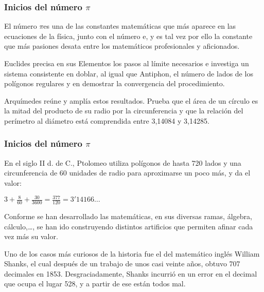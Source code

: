 \documentclass{beamer}
\newcommand{\PI}{{$\pi$}}
\begin{document}
\begin{frame}
\frametitle{Inicios del número \PI}

El número \PI  es una de las constantes matemáticas que más aparece en las ecuaciones de la física, junto con el número e, y es tal vez por ello la constante que más pasiones desata entre los matemáticos profesionales y aficionados.

Euclides precisa en sus Elementos los pasos al límite necesarios e investiga un sistema consistente en doblar, al igual que Antiphon, el número de lados de los polígonos regulares y en demostrar la convergencia del procedimiento.

Arquímedes reúne y amplía estos resultados. Prueba que el área de un círculo es la mitad del producto de su radio por la circunferencia y que la relación del perímetro al diámetro está comprendida entre 3,14084 y 3,14285.

\end{frame}

\begin{frame}
\frametitle{Inicios del número \PI}

En el siglo II d. de C., Ptolomeo utiliza polígonos de hasta 720 lados y una circunferencia de 60 unidades de radio para  aproximarse un poco más, y da el valor:

\centerline{$3 + \frac{8}{60} + \frac {30}{3600}= \frac{377}{120} = 3'14166\dots$}

Conforme se han desarrollado las matemáticas, en sus diversas ramas, álgebra, cálculo,\dots, se han ido construyendo distintos artificios que permiten afinar cada vez más su valor.

Uno de los casos más curiosos de la historia fue el del matemático inglés William Shanks, el cual después de un trabajo de unos casi veinte años, obtuvo 707 decimales en 1853. Desgraciadamente, Shanks incurrió en un error en el decimal que ocupa el lugar 528, y a partir de ese están todos mal.\cite{link1}

\end {frame}
\end{document}
